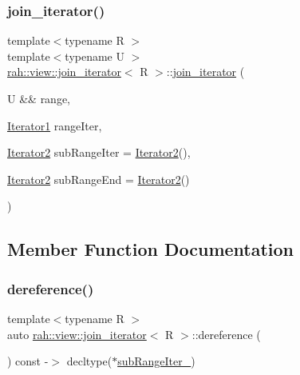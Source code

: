 \subsubsection{\texorpdfstring{join\_iterator()}{join\_iterator()}}
{\footnotesize\ttfamily template$<$typename R $>$ \\
template$<$typename U $>$ \\
\mbox{\hyperlink{structrah_1_1view_1_1join__iterator}{rah\+::view\+::join\+\_\+iterator}}$<$ R $>$\+::\mbox{\hyperlink{structrah_1_1view_1_1join__iterator}{join\+\_\+iterator}} (\begin{DoxyParamCaption}\item[{U \&\&}]{range,  }\item[{\mbox{\hyperlink{structrah_1_1view_1_1join__iterator_a8b71c6f25eee2915e2a8afc6e024196d}{Iterator1}}}]{range\+Iter,  }\item[{\mbox{\hyperlink{structrah_1_1view_1_1join__iterator_ae03a066174f3422c70d0e3c22e68d9f7}{Iterator2}}}]{sub\+Range\+Iter = {\ttfamily \mbox{\hyperlink{structrah_1_1view_1_1join__iterator_ae03a066174f3422c70d0e3c22e68d9f7}{Iterator2}}()},  }\item[{\mbox{\hyperlink{structrah_1_1view_1_1join__iterator_ae03a066174f3422c70d0e3c22e68d9f7}{Iterator2}}}]{sub\+Range\+End = {\ttfamily \mbox{\hyperlink{structrah_1_1view_1_1join__iterator_ae03a066174f3422c70d0e3c22e68d9f7}{Iterator2}}()} }\end{DoxyParamCaption})\hspace{0.3cm}{\ttfamily [inline]}}



\subsection{Member Function Documentation}
\mbox{\label{structrah_1_1view_1_1join__iterator_af0786d44ba77073702b8d3c856232ffa}} 
\subsubsection{\texorpdfstring{dereference()}{dereference()}}
{\footnotesize\ttfamily template$<$typename R $>$ \\
auto \mbox{\hyperlink{structrah_1_1view_1_1join__iterator}{rah\+::view\+::join\+\_\+iterator}}$<$ R $>$\+::dereference (\begin{DoxyParamCaption}{ }\end{DoxyParamCaption}) const -\/$>$ decltype($\ast$\mbox{\hyperlink{structrah_1_1view_1_1join__iterator_a49b089a83af39b5f6893f57ad4a1d81c}{sub\+Range\+Iter\+\_\+}}) \hspace{0.3cm}{\ttfamily [inline]}}

